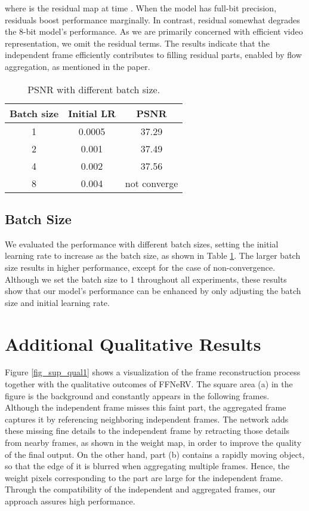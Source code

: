 \documentclass[sigconf]{acmart}
\begin{document}
where  is the residual map at time .
When the model has full-bit precision, residuals boost performance marginally.
In contrast, residual somewhat degrades the 8-bit model's performance.
As we are primarily concerned with efficient video representation, we omit the residual terms.
The results indicate that the independent frame efficiently contributes to filling residual parts, enabled by flow aggregation, as mentioned in the paper.

\begin{table}[ht]
\centering
\caption{PSNR with different batch size.}
\vskip 0.15in
\begin{tabular}{c|c||c}
\hline
Batch size & Initial LR & PSNR  \\ \hline
1          & 0.0005     & 37.29 \\ \hline
2          & 0.001      & 37.49 \\ \hline
4          & 0.002      & 37.56 \\ \hline
8          & 0.004      & not converge\\ \hline
\end{tabular}
\label{tab_abl_bs}
\end{table}

\subsection{Batch Size}
We evaluated the performance with different batch sizes, setting the initial learning rate to increase as the batch size, as shown in Table \ref{tab_abl_bs}.
The larger batch size results in higher performance, except for the case of non-convergence.
Although we set the batch size to 1 throughout all experiments, these results show that our model's performance can be enhanced by only adjusting the batch size and initial learning rate.

\section{Additional Qualitative Results}
Figure \ref{fig_sup_qual1} shows a visualization of the frame reconstruction process together with the qualitative outcomes of FFNeRV.
The square area (a) in the figure is the background and constantly appears in the following frames.
Although the independent frame  misses this faint part, the aggregated frame  captures it by referencing neighboring independent frames.
The network adds these missing fine details to the independent frame by retracting those details from nearby frames, as shown in the weight map, in order to improve the quality of the final output.
On the other hand, part (b) contains a rapidly moving object, so that the edge of it is blurred when aggregating multiple frames.
Hence, the weight pixels corresponding to the part are large for the independent frame.
Through the compatibility of the independent and aggregated frames, our approach assures high performance.
\end{document}
